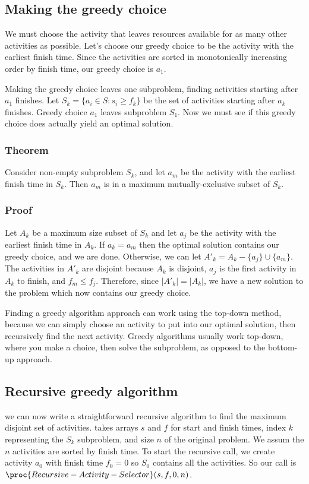 \documentclass[11pt]{article}
\def \n {\par \vspace{\baselineskip}}
\theoremstyle{definition}
\begin{document}
\subsection*{Making the greedy choice}
We must choose the activity that leaves resources available for as many other activities as possible. 
Let's choose our greedy choice to be the activity with the earliest finish time.  Since the 
activities are sorted in monotonically increasing order by finish time, our greedy choice is \(a_1\). 

Making the greedy choice leaves one subproblem, finding activities starting after \(a_1\) finishes. 
Let \(S_k = \{a_i \in S : s_i \geq f_k\}\) be the set of activities starting after \(a_k\) finishes. 
Greedy choice \(a_1\) leaves subproblem \(S_1\).  Now we must see if this greedy choice does 
actually yield an optimal solution.

\subsubsection*{Theorem}
Consider non-empty subproblem \(S_k\), and let \(a_m\) be the activity with the earliest finish 
time in \(S_k\).  Then \(a_m\) is in a maximum mutually-exclusive subset of \(S_k\).

\subsubsection*{Proof}
Let \(A_k\) be a maximum size subset of \(S_k\) and let \(a_j\) be the activity with the earliest 
finish time in \(A_k\).  If \(a_k = a_m\) then the optimal solution contains our greedy choice, 
and we are done.  Otherwise, we can let \(A'_k = A_k - \{a_j\} \cup \{a_m\}\).  The activities 
in \(A'_k\) are disjoint because \(A_k\) is disjoint, \(a_j\) is the first activity in \(A_k\) 
to finish, and \(f_m \leq f_j\).  Therefore, since \(|A'_k| = |A_k|\), we have a new solution to 
the problem which now contains our greedy choice.

\n 
Finding a greedy algorithm approach can work using the top-down method, because we can simply choose 
an activity to put into our optimal solution, then recursively find the next activity.  Greedy 
algorithms usually work top-down, where you make a choice, then solve the subproblem, as opposed 
to the bottom-up approach.
\newpage 

\subsection*{Recursive greedy algorithm}
we can now write a straightforward recursive algorithm to find the maximum disjoint set of 
activities.  takes arrays \(s\) and \(f\) for start and finish 
times, index \(k\) representing the \(S_k\) subproblem, and size \(n\) of the original problem.  
We assum the \(n\) activities are sorted by finish time.  To start the recursive call, we create 
activity \(a_0\) with finish time \(f_0 = 0\) so \(S_0\) contains all the activities.  So our 
call is \(\proc{Recursive-Activity-Selector}(s,f,0,n)\).
\end{document}
